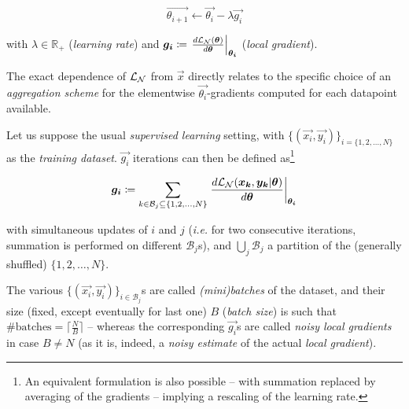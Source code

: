 \begin{equation} \label{eq:1}
    \vec{\theta_{i+1}} \leftarrow  \vec{\theta_{i}} - \lambda\vec{g_i}
\end{equation}

with $\lambda \in \mathbb{R}_+$ (\textit{learning rate}) and $\bm{g_i} \coloneqq \left.\frac{\mathop{d\mathcal{L}_{\mathcal{N}}(\bm{\theta})}}{\mathop{d\bm{\theta}}} \right|_{\bm{\theta_{i}}}$ (\textit{local gradient}).

The exact dependence of $\mathcal{L}_{\mathcal{N}}$ from $\vec{x}$ directly relates to the specific choice of an \textit{aggregation scheme} for the elementwise $\vec{\theta_{i}}$-gradients computed for each datapoint available.

Let us suppose the usual \textit{supervised learning} setting, with $\{(\vec{x_i}, \vec{y_i})\}_{i = \{1,2,\dots,N\}}$ as the \textit{training dataset}. $\vec{g_i}$ iterations can then be defined as\footnote{An equivalent formulation is also possible -- with summation replaced by averaging of the gradients -- implying a rescaling of the learning rate.}

$$\bm{g_i} \coloneqq \sum_{k \in \mathcal{B}_j \subseteq \{1,2,\dots,N\}}{\left.\frac{\mathop{d\mathcal{L}_{\mathcal{N}}(\bm{x_k}, \bm{y_k}|\bm{\theta})}}{\mathop{d\bm{\theta}}} \right|_{\bm{\theta_{i}}}}$$

with simultaneous updates of $i$ and $j$ (\textit{i.e.} for two consecutive iterations, summation is performed on different $\mathcal{B}_j$s), and $\bigcup_j\mathcal{B}_j$ a partition of the (generally shuffled) $\{1,2,\dots,N\}$.

The various $\{(\vec{x_i}, \vec{y_i})\}_{i \in \mathcal{B}_j}$s are called \textit{(mini)batches} of the dataset, and their size (fixed, except eventually for last one) $B$ (\textit{batch size}) is such that $\#\text{batches} = \lceil \frac{N}{B}\rceil$ -- whereas the corresponding $\vec{g_i}$s are called \textit{noisy local gradients} in case $B \neq N$ (as it is, indeed, a \textit{noisy estimate} of the actual \textit{local gradient}).

